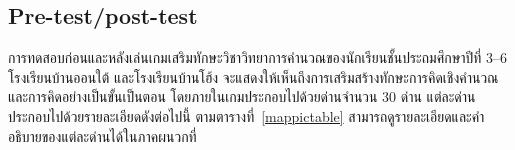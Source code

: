 \subsection{Pre-test/post-test}
การทดสอบก่อนและหลังเล่นเกมเสริมทักษะวิชาวิทยาการคำนวณของนักเรียนชั้นประถมศึกษาปีที่ 3--6 โรงเรียนบ้านออนใต้ และโรงเรียนบ้านโฮ้ง จะแสดงให้เห็นถึงการเสริมสร้างทักษะการคิดเชิงคำนวณ และการคิดอย่างเป็นขั้นเป็นตอน โดยภายในเกมประกอบไปด้วยด่านจำนวน 30 ด่าน
แต่ละด่านประกอบไปด้วยรายละเอียดดังต่อไปนี้ ตามตารางที่~\ref{mappictable} สามารถดูรายละเอียดและคำอธิบายของแต่ละด่านได้ในภาคผนวกที่~
